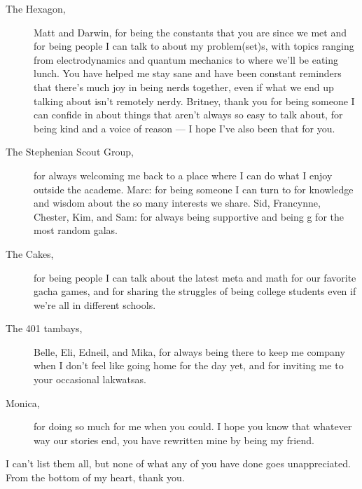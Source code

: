 \begin{description}
    \item[The Hexagon,] Matt and Darwin, for being the constants that you are since we met and for being people I can talk to about my problem(set)s, with topics ranging from electrodynamics and quantum mechanics to where we'll be eating lunch. You have helped me stay sane and have been constant reminders that there's much joy in being nerds together, even if what we end up talking about isn't remotely nerdy. Britney, thank you for being someone I can confide in about things that aren't always so easy to talk about, for being kind and a voice of reason --- I hope I've also been that for you.
    \item[The Stephenian Scout Group,] for always welcoming me back to a place where I can do what I enjoy outside the academe. Marc: for being someone I can turn to for knowledge and wisdom about the so many interests we share. Sid, Francynne, Chester, Kim, and Sam: for always being supportive and being g for the most random galas. 
    \item[The Cakes,] for being people I can talk about the latest meta and math for our favorite gacha games, and for sharing the struggles of being college students even if we're all in different schools. 
    \item[The 401 tambays,] Belle, Eli, Edneil, and Mika, for always being there to keep me company when I don't feel like going home for the day yet, and for inviting me to your occasional lakwatsas.
    \item[Monica,] for doing so much for me when you could. I hope you know that whatever way our stories end, you have rewritten mine by being my friend.
\end{description}

I can't list them all, but none of what any of you have done goes unappreciated. From the bottom of my heart, thank you.
